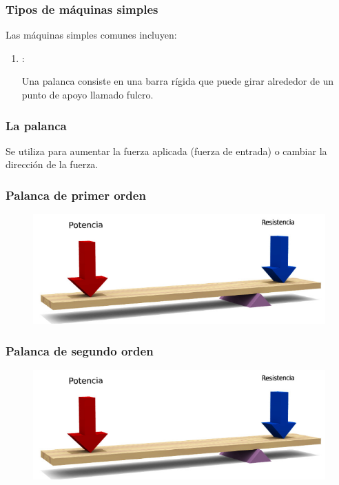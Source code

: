 \documentclass[14pt]{beamer}
\begin{document}
\begin{frame}
\frametitle{Tipos de máquinas simples}
Las máquinas simples comunes incluyen:
\pause
{}
\begin{enumerate}[<+->]
\item {}:

Una palanca consiste en una barra rígida que puede girar alrededor de un punto de apoyo llamado fulcro.
\seti
\end{enumerate}
\end{frame}
\begin{frame}
\frametitle{La palanca}
Se utiliza para aumentar la fuerza aplicada (fuerza de entrada) o cambiar la dirección de la fuerza.
\end{frame}
\begin{frame}
\frametitle{Palanca de primer orden}
\begin{figure}
    \centering
    \includegraphics[scale=0.5]{Imagenes/Palanca_01.png}
\end{figure}
\end{frame}
\begin{frame}
\frametitle{Palanca de segundo orden}
\begin{figure}
    \centering
    \includegraphics[scale=0.5]{Imagenes/Palanca_01.png}
\end{figure}
\end{frame}
\end{document}

